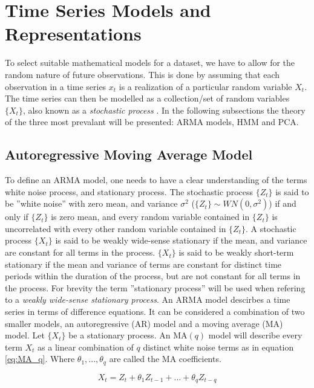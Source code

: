 \section{Time Series Models and Representations} \label{sec:ts_models}
To select suitable mathematical models for a dataset, we have to allow for the random nature of future observations. 
This is done by assuming that each observation in a time series $x_t$ is a realization of a particular random variable $X_t$. 
The time series can then be modelled as a collection/set of random variables $\{X_t\}$, also known as a \textit{stochastic process} \cite{brockwell_davis_advanced}. 
In the following subsections the theory of the three most prevalant will be presented: ARMA models, HMM and PCA.

\subsection{Autoregressive Moving Average Model}
To define an ARMA model, one needs to have a clear understanding of the terms white noise process, and stationary process. 
The stochastic process $\{Z_t\}$ is said to be ''white noise'' with zero mean, and variance $\sigma^2$ ($\{Z_t\} \sim WN(0, \sigma^2)$) if and only if $\{Z_t\}$ is zero mean, and every random variable contained in $\{Z_t\}$ is uncorrelated with every other random variable contained in $\{Z_t\}$. 
A stochastic process $\{X_t\}$ is said to be weakly wide-sense stationary if the mean, and variance are constant for all terms in the process. 
$\{X_t\}$ is said to be weakly short-term stationary if the mean and variance of terms are constant for distinct time periods within the duration of the process, but are not constant for all terms in the process. 
For brevity the term ''stationary process'' will be used when refering to a \textit{weakly wide-sense stationary process}. 
An ARMA model descirbes a time series in terms of difference equations. 
It can be considered a combination of two smaller models, an autoregressive (AR) model and a moving average (MA) model. 
Let $\{X_t\}$ be a stationary process. 
An $\mathrm{MA}(q)$ model will describe every term $X_t$ as a linear combination of $q$ distinct white noise terms as in equation \eqref{eq:MA_q}. Where $\theta_1, ... ,\theta_q$ are called the MA coefficients.

\begin{equation}
    X_t = Z_{t} + \theta_1 Z_{t-1} + ... + \theta_q Z_{t-q}
    \label{eq:MA_q}
\end{equation}

